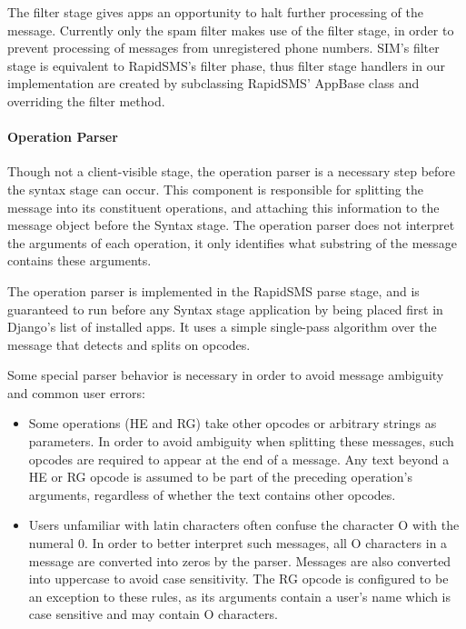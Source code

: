 \documentclass{acm_proc_article-sp}
\begin{document}
The filter stage gives apps an opportunity to halt further processing of the message. Currently only the spam filter makes use of the filter stage, in order to prevent processing of messages from unregistered phone numbers. SIM's filter stage is equivalent to RapidSMS's filter phase, thus filter stage handlers in our implementation are created by subclassing RapidSMS' AppBase class and overriding the filter method.

\paragraph{Operation Parser}

Though not a client-visible stage, the operation parser is a necessary step before the syntax stage can occur. This component is responsible for splitting the message into its constituent operations, and attaching this information to the message object before the Syntax stage. The operation parser does not interpret the arguments of each operation, it only identifies what substring of the message contains these arguments.

The operation parser is implemented in the RapidSMS parse stage, and is guaranteed to run before any Syntax stage application by being placed first in Django's list of installed apps. It uses a simple single-pass algorithm over the message that detects and splits on opcodes.

Some special parser behavior is necessary in order to avoid message ambiguity and common user errors:

\begin{itemize}
\item Some operations (HE and RG) take other opcodes or arbitrary strings as parameters. In order to avoid ambiguity when splitting these messages, such opcodes are required to appear at the end of a message. Any text beyond a HE or RG opcode is assumed to be part of the preceding operation's arguments, regardless of whether the text contains other opcodes.
\item Users unfamiliar with latin characters often confuse the character O with the numeral 0. In order to better interpret such messages, all O characters in a message are converted into zeros by the parser. Messages are also converted into uppercase to avoid case sensitivity. The RG opcode is configured to be an exception to these rules, as its arguments contain a user's name which is case sensitive and may contain O characters.
\end{itemize}
\end{document}
